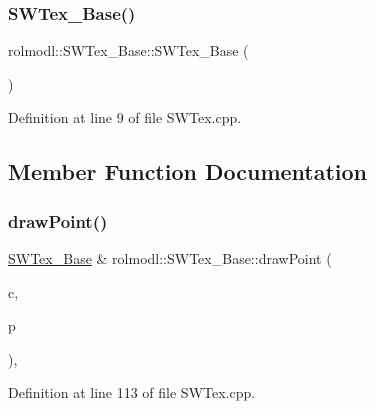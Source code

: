 \subsubsection{\texorpdfstring{SWTex\_Base()}{SWTex\_Base()}\hspace{0.1cm}{\footnotesize\ttfamily [4/4]}}
{\footnotesize\ttfamily rolmodl\+::\+S\+W\+Tex\+\_\+\+Base\+::\+S\+W\+Tex\+\_\+\+Base (\begin{DoxyParamCaption}{ }\end{DoxyParamCaption})\hspace{0.3cm}{\ttfamily [protected]}}



Definition at line 9 of file S\+W\+Tex.\+cpp.



\subsection{Member Function Documentation}
\mbox{\label{classrolmodl_1_1_s_w_tex___base_a785eac0987fda4840638891dd0192592}} 
\subsubsection{\texorpdfstring{drawPoint()}{drawPoint()}}
{\footnotesize\ttfamily \mbox{\hyperlink{classrolmodl_1_1_s_w_tex___base}{S\+W\+Tex\+\_\+\+Base}} \& rolmodl\+::\+S\+W\+Tex\+\_\+\+Base\+::draw\+Point (\begin{DoxyParamCaption}\item[{const \mbox{\hyperlink{structrolmodl_1_1_r_g_b_a}{R\+G\+BA}}}]{c,  }\item[{const \mbox{\hyperlink{structrolmodl_1_1geom_1_1_pos}{geom\+::\+Pos}}}]{p }\end{DoxyParamCaption})\hspace{0.3cm}{\ttfamily [protected]}, {\ttfamily [noexcept]}}



Definition at line 113 of file S\+W\+Tex.\+cpp.

\mbox{\label{classrolmodl_1_1_s_w_tex___base_a71436a7fc7e3be9c94d55e772ceb25fa}} 
